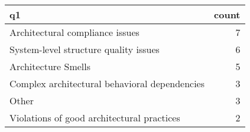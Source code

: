 \begin{tabular}{lr}
\toprule
                                            q1 &  count \\
\midrule
               Architectural compliance issues &      7 \\
         System-level structure quality issues &      6 \\
                           Architecture Smells &      5 \\
 Complex architectural behavioral dependencies &      3 \\
                                         Other &      3 \\
    Violations of good architectural practices &      2 \\
\bottomrule
\end{tabular}

